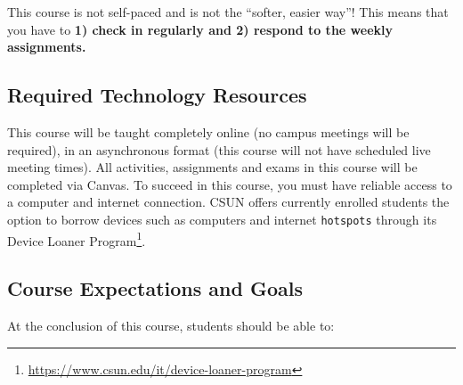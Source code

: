 \documentclass[
  letterpaper,
  DIV=11,
  numbers=noendperiod]{scrartcl}
\DeclareRobustCommand{\href}[2]{#2\footnote{\url{#1}}}
\begin{document}
\begin{tcolorbox}[enhanced jigsaw, leftrule=.75mm, breakable, opacityback=0, bottomrule=.15mm, rightrule=.15mm, colbacktitle=quarto-callout-warning-color!10!white, colframe=quarto-callout-warning-color-frame, arc=.35mm, bottomtitle=1mm, left=2mm, title=\textcolor{quarto-callout-warning-color}{\faExclamationTriangle}\hspace{0.5em}{Warning}, titlerule=0mm, toptitle=1mm, toprule=.15mm, opacitybacktitle=0.6, colback=white, coltitle=black]

This course is not self-paced and is not the ``softer, easier way''!
This means that you have to \textbf{1) check in regularly and 2) respond
to the weekly assignments.}

\end{tcolorbox}

\hypertarget{sec-required-technology-resources}{%
\subsection{Required Technology
Resources}\label{sec-required-technology-resources}}

This course will be taught completely online (no campus meetings will be
required), in an asynchronous format (this course will not have
scheduled live meeting times). All activities, assignments and exams in
this course will be completed via Canvas. To succeed in this course, you
must have reliable access to a computer and internet connection. CSUN
offers currently enrolled students the option to borrow devices such as
computers and internet \texttt{hotspots} through its
\href{https://www.csun.edu/it/device-loaner-program}{Device Loaner
Program}.

\hypertarget{course-expectations-and-goals}{%
\subsection{Course Expectations and
Goals}\label{course-expectations-and-goals}}

At the conclusion of this course, students should be able to:
\end{document}
